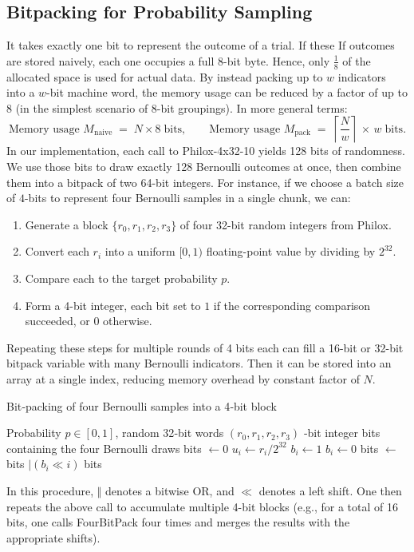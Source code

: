 \subsection{Bitpacking for Probability Sampling}
It takes exactly one bit to represent the outcome of a trial. If these If outcomes are stored naively, each one occupies a full 8-bit byte. Hence, only \( \tfrac{1}{8} \) of the allocated space is used for actual data. By instead packing up to \(w\) indicators into a \(w\)-bit machine word, the memory usage can be reduced by a factor of up to \(8\) (in the simplest scenario of 8-bit groupings). In more general terms:
\[
  \text{Memory usage }M_{\text{naive}}
  \;=\;
  N \times 8\;\text{bits},
  \qquad
  \text{Memory usage }M_{\text{pack}}
  \;=\;
  \left\lceil\frac{N}{w}\right\rceil \,\times\,w\;\text{bits}.
\]
In our implementation, each call to Philox-4x32-10 yields 128 bits of randomness. We use those bits to draw exactly 128 Bernoulli outcomes at once, then combine them into a \(\mathrm{bitpack}\) of two 64-bit integers. For instance, if we choose a batch size of \(4\)-bits to represent four Bernoulli samples in a single chunk, we can:

\begin{enumerate}
    \item Generate a block \(\{r_0, r_1, r_2, r_3\}\) of four 32-bit random integers from Philox.
    \item Convert each \(r_i\) into a uniform \([0,1)\) floating-point value by dividing by \(2^{32}\).
    \item Compare each to the target probability \(p\).
    \item Form a 4-bit integer, each bit set to \(1\) if the corresponding comparison succeeded, or \(0\) otherwise.
\end{enumerate}

Repeating these steps for multiple rounds of 4 bits each can fill a 16-bit or 32-bit \(\mathrm{bitpack}\) variable with many Bernoulli indicators. Then it can be stored into an array at a single index, reducing memory overhead by constant factor of $N$. 

\begin{algorithm}[H]
  \caption{Bit‑packing of four Bernoulli samples into a 4‑bit block}
  \label{alg:four_bit_pack}
  \begin{algorithmic}[1]
    \Require Probability $p\in[0,1]$, random 32‑bit words $(r_0,r_1,r_2,r_3)$
    ‑bit integer bits containing the four Bernoulli draws
      \State bits $\gets 0$
        \State $u_i \gets r_i / 2^{32}$ \Comment{$u_i\in[0,1)$}
            \State $b_i \gets 1$
        \Else
            \State $b_i \gets 0$
        \EndIf
        \State bits $\gets$ bits $\mid (b_i \ll i)$ 
      \EndFor
      \State \Return bits
    \EndProcedure
  \end{algorithmic}
\end{algorithm}

In this procedure, \(\Vert\) denotes a bitwise OR, and \(\ll\) denotes a left shift. One then repeats the above call to accumulate multiple 4-bit blocks (e.g., for a total of 16 bits, one calls FourBitPack four times and merges the results with the appropriate shifts).